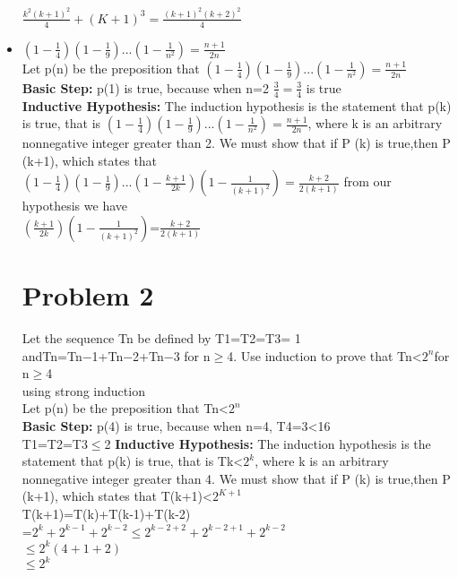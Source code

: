 \documentclass[12pt,letterpaper]{article}
\begin{document}
\begin{itemize}
      \(\frac{k^2(k+1)^2}{4} +(K+1)^3=\frac{(k+1)^2(k+2)^2}{4}\)
      \item \((1-\frac{1}{4})(1-\frac{1}{9})...(1-\frac{1}{n^2})=\frac{n+1}{2n}\)\\
      Let p(n)  be the preposition that \((1-\frac{1}{4})(1-\frac{1}{9})...(1-\frac{1}{n^2})=\frac{n+1}{2n}\)\\
      \textbf{Basic Step:} p(1) is true, because when n=2 \(\frac{3}{4}=\frac{3}{4}\) is true\\
      \textbf{Inductive Hypothesis:} The induction hypothesis is the statement
      that p(k) is true, that is \((1-\frac{1}{4})(1-\frac{1}{9})...(1-\frac{1}{n^2})=\frac{n+1}{2n}\),  where k is an arbitrary nonnegative integer
      greater than 2. We must show that if P (k) is true,then P (k+1), which states that\\
      \((1-\frac{1}{4})(1-\frac{1}{9})...(1-\frac{k+1}{2k})(1-\frac{1}{(k+1)^2})=\frac{k+2}{2(k+1)}\)
      from our hypothesis we have \\
      \((\frac{k+1}{2k})(1-\frac{1}{(k+1)^2})\)=\(\frac{k+2}{2(k+1)}\)
      \section*{Problem 2}
      Let the sequence Tn be defined by T1=T2=T3= 1 andTn=Tn−1+Tn−2+Tn−3 for n\(\geq\)4.  Use induction to prove that Tn<\(2^n\)for n\(\geq\)4\\
      using strong induction\\
      Let p(n)  be the preposition that Tn<\(2^n\)\\
      \textbf{Basic Step:} p(4) is true, because when n=4, T4=3<16\\
      T1=T2=T3\(\leq\)2
      \textbf{Inductive Hypothesis:} The induction hypothesis is the statement
      that p(k) is true, that is Tk<\(2^k\),  where k is an arbitrary nonnegative integer
      greater than 4. We must show that if P (k) is true,then P (k+1), which states that T(k+1)<\(2^{K+1}\)\\
      T(k+1)=T(k)+T(k-1)+T(k-2)\\=\(2^k+2^{k-1}+2^{k-2}\)\(\leq\)\(2^{k-2+2}+2^{k-2+1}+2^{k-2}\)\\
      \(\leq\)\(2^k(4+1+2)\)\\
      \(\leq\)\(2^k\)


\end{itemize}
\end{document}

